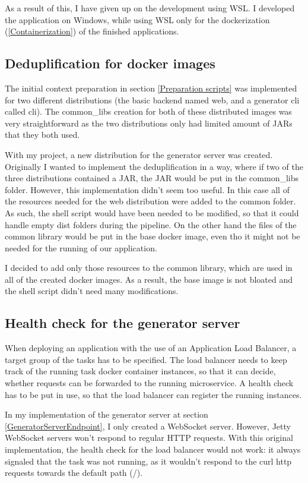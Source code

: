 		As a result of this, I have given up on the development using WSL. I developed the application on Windows, while using WSL only for the
		dockerization (\ref{Containerization}) of the finished applications.

	\subsection{Deduplification for docker images}
		The initial context preparation in section \ref{Preparation scripts} was implemented for two different distributions (the basic backend 
		named web, and a generator cli called cli). The common\_libs creation for both of these distributed images was very straightforward
		as the two distributions only had limited amount of JARs that they both used.

		With my project, a new distribution for the generator server was created. Originally I wanted to implement the deduplification in a way,
		where if two of the three distributions contained a JAR, the JAR would be put in the common\_libs folder.
		However, this implementation didn't seem too useful. In this case all of the resources needed for the web distribution were added to the common folder.
		As such, the shell script would have been needed to be modified, so that it could handle empty dist folders during the pipeline. On the other hand
		the files of the common library would be put in the base docker image, even tho it might not be needed for the running of our application.

		I decided to add only those resources to the common library, which are used in all of the created docker images. 
		As a result, the base image is not bloated and the shell script didn't need many modifications.

	\subsection{Health check for the generator server} \label{healthcheck}
		When deploying an application with the use of an Application Load Balancer, a target group of the tasks has to be specified.
		The load balancer needs to keep track of the running task docker container instances, so that it can decide, whether requests can be 
		forwarded to the running microservice. A health check has to be put in use, so that the load balancer can register the running instances.

		In my implementation of the generator server at section \ref{GeneratorServerEndpoint}, I only created a WebSocket server. However, Jetty 
		WebSocket servers won't respond to regular HTTP requests. With this original implementation, the health check for the load balancer would
		not work: it always signaled that the task was not running, as it wouldn't respond to the curl http requests towards the default path (/).


